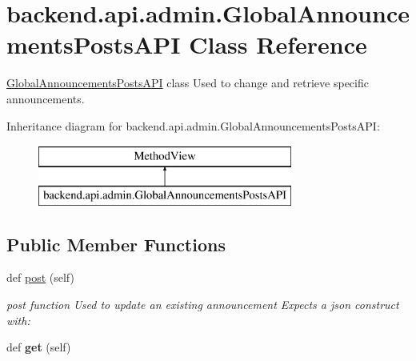 \hypertarget{classbackend_1_1api_1_1admin_1_1_global_announcements_posts_a_p_i}{}\section{backend.\+api.\+admin.\+Global\+Announcements\+Posts\+A\+P\+I Class Reference}
\label{classbackend_1_1api_1_1admin_1_1_global_announcements_posts_a_p_i}


\hyperlink{classbackend_1_1api_1_1admin_1_1_global_announcements_posts_a_p_i}{Global\+Announcements\+Posts\+A\+P\+I} class Used to change and retrieve specific announcements.  


Inheritance diagram for backend.\+api.\+admin.\+Global\+Announcements\+Posts\+A\+P\+I\+:\begin{figure}[H]
\begin{center}
\leavevmode
\includegraphics[height=2.000000cm]{classbackend_1_1api_1_1admin_1_1_global_announcements_posts_a_p_i}
\end{center}
\end{figure}
\subsection*{Public Member Functions}
\begin{DoxyCompactItemize}
\item 
def \hyperlink{classbackend_1_1api_1_1admin_1_1_global_announcements_posts_a_p_i_a0f3722ea358626e5e72cb27cb4ea798b}{post} (self)
\begin{DoxyCompactList}\small\item\em post function Used to update an existing announcement Expects a json construct with\+: \end{DoxyCompactList}\item 
\hypertarget{classbackend_1_1api_1_1admin_1_1_global_announcements_posts_a_p_i_a28c29391187589ac3600d4b004b62a14}{}def {\bfseries get} (self)\label{classbackend_1_1api_1_1admin_1_1_global_announcements_posts_a_p_i_a28c29391187589ac3600d4b004b62a14}

\end{DoxyCompactItemize}


